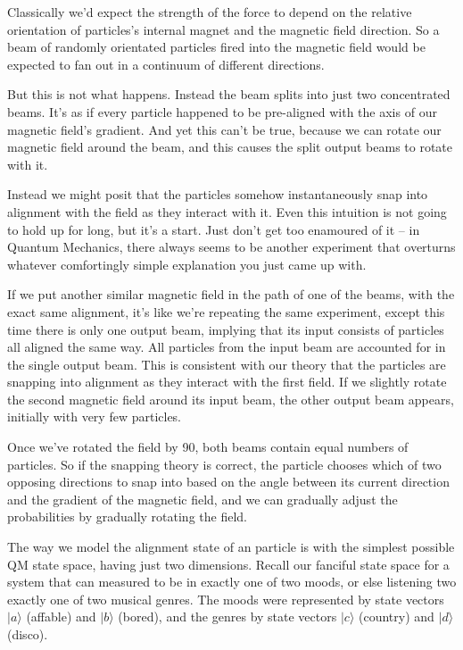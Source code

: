 Classically we'd expect the strength of the force to depend on the relative orientation of particles's internal magnet and the magnetic field direction. So a beam of randomly orientated particles fired into the magnetic field would be expected to fan out in a continuum of different directions.

But this is not what happens. Instead the beam splits into just two concentrated beams. It's as if every particle happened to be pre-aligned with the axis of our magnetic field's gradient. And yet this can't be true, because we can rotate our magnetic field around the beam, and this causes the split output beams to rotate with it.

Instead we might posit that the particles somehow instantaneously snap into alignment with the field as they interact with it. Even this intuition is not going to hold up for long, but it's a start. Just don't get too enamoured of it -- in Quantum Mechanics, there always seems to be another experiment that overturns whatever comfortingly simple explanation you just came up with.

If we put another similar magnetic field in the path of one of the beams, with the exact same alignment, it's like we're repeating the same experiment, except this time there is only one output beam, implying that its input consists of particles all aligned the same way. All particles from the input beam are accounted for in the single output beam. This is consistent with our theory that the particles are snapping into alignment as they interact with the first field. If we slightly rotate the second magnetic field around its input beam, the other output beam appears, initially with very few particles.

Once we've rotated the field by 90\textdegree, both beams contain equal numbers of particles. So if the snapping theory is correct, the particle chooses which of two opposing directions to snap into based on the angle between its current direction and the gradient of the magnetic field, and we can gradually adjust the probabilities by gradually rotating the field.

The way we model the alignment state of an particle is with the simplest possible QM state space, having just two dimensions. Recall our fanciful state space for a system that can measured to be in exactly one of two moods, or else listening two exactly one of two musical genres. The moods were represented by state vectors $|a\rangle$ (affable) and $|b\rangle$ (bored), and the genres by state vectors $|c\rangle$ (country) and $|d\rangle$ (disco). 

